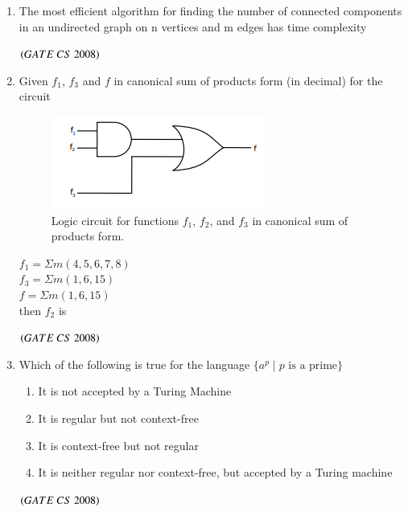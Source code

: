 \documentclass[journal]{IEEEtran}
\numberwithin{equation}{enumi}
\numberwithin{figure}{enumi}
\begin{document}
\begin{enumerate}
\item The most efficient algorithm for finding the number of connected components in an undirected graph on n vertices and m edges has time complexity 
\begin{enumerate} 
\end{enumerate}
\hfill $\left(GATE\ CS\  2008\right)$

\item Given $f_1$, $f_3$ and $f$ in canonical sum of products form (in decimal) for the circuit 
\begin{figure}[H]
    \centering
    \includegraphics[width=0.5\columnwidth]{figs/fig2.png}
    \caption{Logic circuit for functions $f_1$, $f_2$, and $f_3$ in canonical sum of products form.}
    \label{fig:2}
   \end{figure}
     $f_1 = \Sigma m(4,5,6,7,8)$\\
     $f_3 = \Sigma m(1,6,15)$\\
     $f= \Sigma m(1,6,15)$\\
     then $f_2$ is
\begin{enumerate} 
\end{enumerate}
\hfill $\left(GATE\ CS\  2008\right)$

\item Which of the following is true for the language $\{a^p \mid p \text{ is a prime}\}$
 \begin{enumerate}
    \item It is not accepted by a Turing Machine 
    \item It is regular but not context-free 
    \item It is context-free but not regular 
    \item It is neither regular nor context-free, but accepted by a Turing machine 
\end{enumerate}
\hfill $\left(GATE\ CS\  2008\right)$


\end{enumerate}
\end{document}
